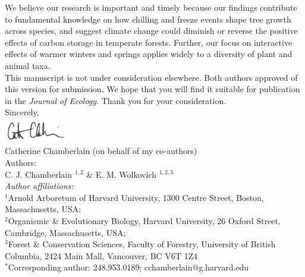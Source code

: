 \documentclass[11pt,a4paper]{article}
\begin{document}
\noindent We believe our research is important and timely because our findings contribute to fundamental knowledge on how chilling and freeze events shape tree growth across species, and suggest climate change could diminish or reverse the positive effects of carbon storage in temperate forests. Further, our focus on interactive effects of warmer winters and springs applies widely to a diversity of plant and animal taxa. \\ %

\noindent This manuscript is not under consideration elsewhere. Both authors approved of this version for submission. We hope that you will find it suitable for publication in the \textit{Journal of Ecology}. Thank you for your consideration. \\

\vspace{1.5ex}
\noindent Sincerely, \\
\includegraphics[width=0.2\textwidth]{full_signature.jpg} \\
\noindent Catherine Chamberlain (on behalf of my co-authors)
\vspace{2ex}\\
\noindent Authors:\\
C. J. Chamberlain $^{1,2}$ \& E. M. Wolkovich $^{1,2,3}$
\vspace{2ex}\\
\emph{Author affiliations:}\\
$^{1}$Arnold Arboretum of Harvard University, 1300 Centre Street, Boston, Massachusetts, USA; \\
$^{2}$Organismic \& Evolutionary Biology, Harvard University, 26 Oxford Street, Cambridge, Massachusetts, USA; \\
$^{3}$Forest \& Conservation Sciences, Faculty of Forestry, University of British Columbia, 2424 Main Mall, Vancouver, BC V6T 1Z4\\
\vspace{2ex}
$^*$Corresponding author: 248.953.0189; cchamberlain@g.harvard.edu\\


\end{document}
